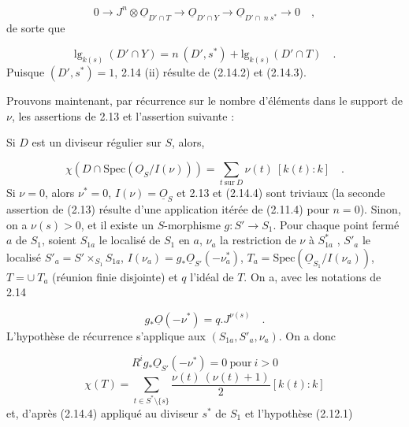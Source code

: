 \begin{equation*}
0 \longrightarrow J^n \otimes \underline{O}_{D'\cap T} \longrightarrow \underline{O}_{D'\cap Y} \longrightarrow \underline{O}_{D'\cap\ n\ s^*} \longrightarrow 0 \quad ,
\end{equation*}
de sorte que 



\begin{equation}\tag{2.14.3}
\mathrm{lg}_{k(s)}\ (D' \cap Y) = n\ (D',s^*) + \mathrm{lg}_{k(s)}(D' \cap T) \quad .
\end{equation}
Puisque $(D',s^*) = 1$, 2.14 (ii) résulte de (2.14.2) et (2.14.3).

Prouvons maintenant, par récurrence sur le nombre d'éléments dans le support de $\nu$, les assertions de 2.13 et l'assertion suivante :

Si $D$ est un diviseur régulier sur $S$, alors,

\begin{equation}\tag{2.14.4}
\chi(D \cap \mathrm{Spec}(\underline{O}_S/I(\nu))) = \sum_{t\ \mathrm{sur}\ D} \nu(t)\ [k(t) : k] \quad .
\end{equation}
Si $\nu = 0$, alors $\nu^* = 0$, $I(\nu) = \underline{O}_S$ et 2.13 et (2.14.4) sont triviaux (la seconde assertion de (2.13) résulte d'une application itérée de (2.11.4) pour $n = 0$). Sinon, on a $\nu(s) > 0$, et il existe un $S$-morphisme $g : S' \longrightarrow S_1$. Pour chaque point fermé $a$ de $S_1$, soient $S_{1a}$ le localisé de $S_1$ en $a$, $\nu_a$ la restriction de $\nu$ à $S_{1a}^*$ , $S'_a$ le localisé $S'_a = S' \times_{S_1} S_{1a}$, $I(\nu_a) = g_* \underline{O}_{S'}(-\nu_a^*)$, $T_a = \mathrm{Spec}(\underline{O}_{S_1}/I(\nu_a))$, $T = \cup\ T_a$ (réunion finie disjointe) et $q$ l'idéal de $T$. On a, avec les notations de 2.14

\begin{equation}\tag{2.14.5}
g_* \underline{O}(-\nu^*) = q.J^{\nu(s)} \quad .
\end{equation}
L'hypothèse de récurrence s'applique aux $(S_{1a}, S'_a, \nu_a)$. On a donc

\begin{equation}\tag{2.14.6}
R^i g_* \underline{O}_{S'}(-\nu^*) = 0 \ \mathrm{pour}\ i > 0
\end{equation}
\begin{equation}\tag{2.14.7}
\chi(T) = \sum_{t \in S^* \setminus \{s\}} \frac{\nu(t)\ (\nu(t)+1)}{2} [k(t) : k]
\end{equation}
et, d'après (2.14.4) appliqué au diviseur $s^*$ de $S_1$ et l'hypothèse (2.12.1)

